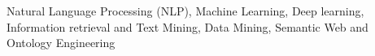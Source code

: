 \begin{cventries}
    \cventry
    {}{}{}{}
    {Natural Language Processing (NLP), Machine Learning, Deep learning, Information retrieval and Text Mining, Data Mining, Semantic Web and Ontology Engineering}
\end{cventries}
